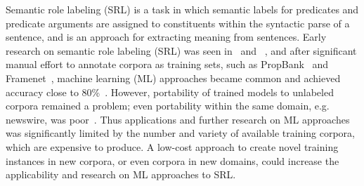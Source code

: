Semantic role labeling (SRL) is a task in which semantic labels for predicates and predicate arguments are assigned to constituents within the syntactic parse of a sentence, and is an approach for extracting meaning from sentences.
Early research on semantic role labeling (SRL) was seen in~\cite{gildea_automatic_2002} and ~\cite{chen_use_2003}, and after significant manual effort to annotate corpora as training sets, such as PropBank~\cite{kingsbury_adding_2002} and Framenet~\cite{ruppenhofer_framenet_2006}, machine learning (ML) approaches became common and achieved accuracy close to 80\%~\cite{carreras_introduction_2005}.
However, portability of trained models to unlabeled corpora remained a problem; even portability within the same domain, e.g. newswire, was poor~\cite{pradhan_towards_2008}.
Thus applications and further research on ML approaches was significantly limited by the number and variety of available training corpora, which are expensive to produce.
A low-cost approach to create novel training instances in new corpora, or even corpora in new domains, could increase the applicability and research on ML approaches to SRL.


